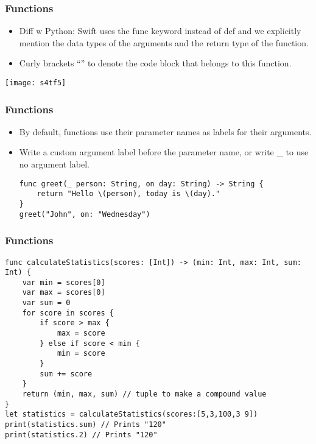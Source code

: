 \begin{frame}[fragile] \frametitle{Functions}

\begin{itemize}
\item Diff w Python: Swift uses the func keyword instead of def and we explicitly mention the data types of the arguments and the return type of the function.
\item Curly brackets “{}” to denote the code block that belongs to this function.
\end{itemize}


\begin{center}
\texttt{[image: s4tf5]}
\end{center}

\end{frame}

\begin{frame}[fragile] \frametitle{Functions}

\begin{itemize}
\item By default, functions use their parameter names as labels for their arguments. 
\item Write a custom argument label before the parameter name, or write \_ to use no argument label.

\begin{lstlisting}
func greet(_ person: String, on day: String) -> String {
    return "Hello \(person), today is \(day)."
}
greet("John", on: "Wednesday")
\end{lstlisting}

\end{itemize}
\end{frame}

\begin{frame}[fragile] \frametitle{Functions}

\begin{lstlisting}
func calculateStatistics(scores: [Int]) -> (min: Int, max: Int, sum: Int) {
    var min = scores[0]
    var max = scores[0]
    var sum = 0
    for score in scores {
        if score > max {
            max = score
        } else if score < min {
            min = score
        }
        sum += score
    }
    return (min, max, sum) // tuple to make a compound value
}
let statistics = calculateStatistics(scores:[5,3,100,3 9])
print(statistics.sum) // Prints "120"
print(statistics.2) // Prints "120"
\end{lstlisting}
\end{frame}

